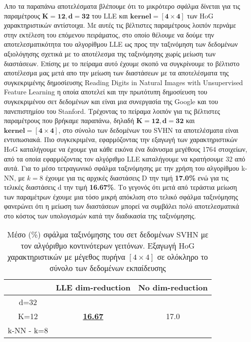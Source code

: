 \par
Απο τα παραπάνω αποτελέσματα βλέπουμε ότι το μικρότερο σφάλμα δίνεται για τις παραμέτρους $\mathbf{K=12, d=32}$ του \textlatin{LLE} και $\mathbf{kernel=[4 \times 4]}$ των \textlatin{HoG} χαρακτηριστικών αντίστοιχα. Με αυτές τις βέλτιστες παραμέτρους λοιπόν περνάμε στην εκτέλεση του επόμενου πειράματος, στο οποίο θέλουμε να δούμε την αποτελεσματικότητα του αλγορίθμου \textlatin{LLE} ως προς την ταξινόμηση των δεδομένων αξιολόγησης σχετικά με το αποτέλεσμα της ταξινόμησης χωρίς μείωση των διαστάσεων. Επίσης με το πείραμα αυτό έχουμε σκοπό να συγκρίνουμε το βέλτιστο αποτέλεσμα μας μετά απο την μείωση των διαστάσεων με τα αποτελέσματα της συγκεκριμένης δημοσίευσης \textlatin{Reading Digits in Natural Images with Unsupervised Feature Learning}\cite{12} η οποία αποτελεί και την πρωτότυπη δημοσίευση του συγκεκριμένου σετ δεδομένων και είναι μια συνεργασία της \textlatin{Google} και του πανεπιστημίου του \textlatin{Stanford}. Τρέχοντας το πείραμα λοιπόν για τις βέλτιστες παραμέτρους που βρήκαμε παραπάνω, δηλαδή $\mathbf{K=12, d=32}$ και $\mathbf{kernel=[4 \times 4]}$, στο σύνολο των δεδομένων του \textlatin{SVHN} τα αποτελέσματα είναι εντυπωσιακά. Πιο συγκεκριμένα, εφαρμόζοντας την εξαγωγή των χαρακτηριστικών \textlatin{HoG} καταλήγουμε να έχουμε για κάθε εικόνα ένα διάνυσμα μεγέθους 1764 στοιχείων, από τα οποία εφαρμόζοντας τον αλγόριθμο \textlatin{LLE} καταλήγουμε να κρατήσουμε 32 από αυτά. Για το μέσο τετραγωνικό σφάλμα ταξινόμησης με την χρήση του αλγορίθμου \textlatin{k-NN}, με $k=8$ έχουμε για τις αρχικές διαστάσεις \textlatin{D} την τιμή \textbf{17.0\%} ενώ για τις τελικές διαστάσεις \textlatin{d} την τιμή \textbf{16.67\%}. Το γεγονός ότι μετά από τεράστια μείωση των παραμέτρων έχουμε μια τόσο μικρή απόκλιση στο τελικό σφάλμα ταξινόμησης φανερώνει ότι η μείωση των διαστάσεων μπορεί να συμβάλει πολύ αποτελεσματικά στο κόστος των υπολογισμών κατά την διαδικασία της ταξινόμησης.

\begin{table}[H]
\singlespacing
\centering
\label{tab:table14}
\caption{Μέσο (\%) σφάλμα ταξινόμησης του σετ δεδομένων \textlatin{SVHN} με τον αλγόριθμο κοντινότερων γειτόνων. Εξαγωγή \textlatin{HoG} χαρακτηριστικών με μέγεθος πυρήνα $[4\times4]$ σε ολόκληρο το σύνολο των δεδομένων εκπαίδευσης}
\vspace*{5mm}
\begin{tabular}{|c|c|c|}
\hline
 & LLE dim-reduction & No dim-reduction \\
\hline
d=32 & & \\
K=12 & \underline{\textbf{16.67}} & 17.0 \\
k-NN - k=8 & & \\
\hline
\end{tabular}
\end{table}


